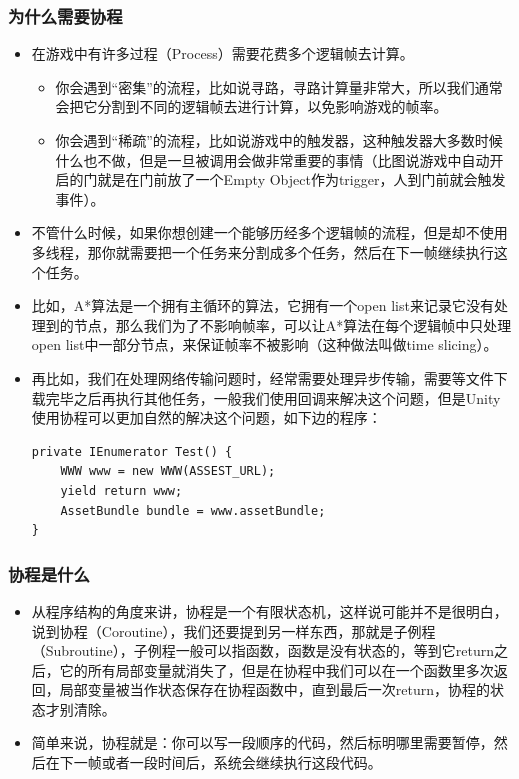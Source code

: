 \documentclass[9pt, b5paper]{article}
\begin{document}
\subsubsection{为什么需要协程}
\label{sec:org03afe12}
\begin{itemize}
\item 在游戏中有许多过程（Process）需要花费多个逻辑帧去计算。
\begin{itemize}
\item 你会遇到“密集”的流程，比如说寻路，寻路计算量非常大，所以我们通常会把它分割到不同的逻辑帧去进行计算，以免影响游戏的帧率。
\item 你会遇到“稀疏”的流程，比如说游戏中的触发器，这种触发器大多数时候什么也不做，但是一旦被调用会做非常重要的事情（比图说游戏中自动开启的门就是在门前放了一个Empty Object作为trigger，人到门前就会触发事件）。
\end{itemize}
\item 不管什么时候，如果你想创建一个能够历经多个逻辑帧的流程，但是却不使用多线程，那你就需要把一个任务来分割成多个任务，然后在下一帧继续执行这个任务。
\item 比如，A*算法是一个拥有主循环的算法，它拥有一个open list来记录它没有处理到的节点，那么我们为了不影响帧率，可以让A*算法在每个逻辑帧中只处理open list中一部分节点，来保证帧率不被影响（这种做法叫做time slicing）。
\item 再比如，我们在处理网络传输问题时，经常需要处理异步传输，需要等文件下载完毕之后再执行其他任务，一般我们使用回调来解决这个问题，但是Unity使用协程可以更加自然的解决这个问题，如下边的程序：
\begin{verbatim}
private IEnumerator Test() {  
    WWW www = new WWW(ASSEST_URL);  
    yield return www;  
    AssetBundle bundle = www.assetBundle;
}
\end{verbatim}
\end{itemize}

\subsubsection{协程是什么}
\label{sec:orgebc9efc}
\begin{itemize}
\item 从程序结构的角度来讲，协程是一个有限状态机，这样说可能并不是很明白，说到协程（Coroutine），我们还要提到另一样东西，那就是子例程（Subroutine），子例程一般可以指函数，函数是没有状态的，等到它return之后，它的所有局部变量就消失了，但是在协程中我们可以在一个函数里多次返回，局部变量被当作状态保存在协程函数中，直到最后一次return，协程的状态才别清除。
\item 简单来说，协程就是：你可以写一段顺序的代码，然后标明哪里需要暂停，然后在下一帧或者一段时间后，系统会继续执行这段代码。
\end{itemize}
\end{document}
